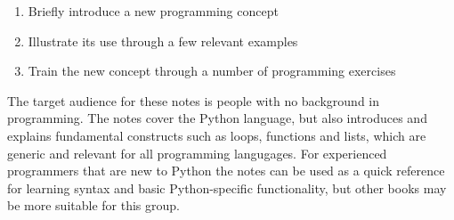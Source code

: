 \documentclass[graybox,envcountchap,sectrefs,final]{svmonodo}
\begin{document}
\begin{enumerate}
 \item Briefly introduce a new programming concept

 \item Illustrate its use through a few relevant examples

 \item Train the new concept through a number of programming exercises
\end{enumerate}

\noindent
The target audience for these notes is people with no background in programming. The notes cover the
Python language, but also introduces and explains fundamental constructs such as loops, functions and lists,
which are generic and relevant for all programming langugages. For experienced programmers that are new
to Python the notes can be used as a quick reference for learning syntax and basic Python-specific
functionality, but other books may be more suitable for this group.
\end{document}
